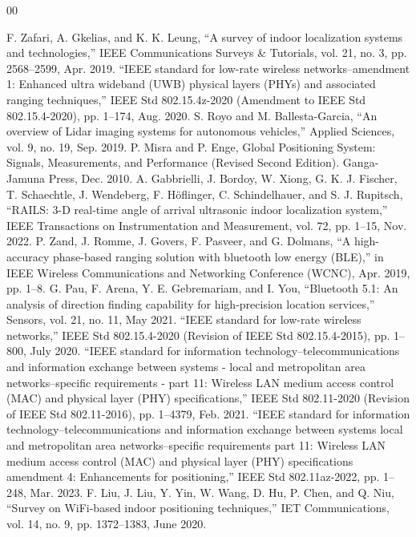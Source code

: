 \documentclass[journal]{IEEEtran}
\begin{document}
\begin{thebibliography}{00}

 F. Zafari, A. Gkelias, and K. K. Leung, “A survey of indoor localization systems and technologies,” IEEE Communications Surveys \& Tutorials, vol. 21, no. 3, pp. 2568–2599, Apr. 2019.
 “IEEE standard for low-rate wireless networks–amendment 1: Enhanced ultra wideband (UWB) physical layers (PHYs) and associated ranging techniques,” IEEE Std 802.15.4z-2020 (Amendment to IEEE Std 802.15.4-2020), pp. 1–174, Aug. 2020.
 S. Royo and M. Ballesta-Garcia, “An overview of Lidar imaging systems for autonomous vehicles,” Applied Sciences, vol. 9, no. 19, Sep. 2019.
 P. Misra and P. Enge, Global Positioning System: Signals, Measurements, and Performance (Revised Second Edition). Ganga-Jamuna Press, Dec. 2010.
 A. Gabbrielli, J. Bordoy, W. Xiong, G. K. J. Fischer, T. Schaechtle, J. Wendeberg, F. H\"oflinger, C. Schindelhauer, and S. J. Rupitsch, “RAILS: 3-D real-time angle of arrival ultrasonic indoor localization system,” IEEE Transactions on Instrumentation and Measurement, vol. 72, pp. 1–15, Nov. 2022.
 P. Zand, J. Romme, J. Govers, F. Pasveer, and G. Dolmans, “A high-accuracy phase-based ranging solution with bluetooth low energy (BLE),” in IEEE Wireless Communications and Networking Conference (WCNC), Apr. 2019, pp. 1–8.
 G. Pau, F. Arena, Y. E. Gebremariam, and I. You, “Bluetooth 5.1: An analysis of direction finding capability for high-precision location services,” Sensors, vol. 21, no. 11, May 2021.
 “IEEE standard for low-rate wireless networks,” IEEE Std 802.15.4-2020 (Revision of IEEE Std 802.15.4-2015), pp. 1–800, July 2020.
 “IEEE standard for information technology–telecommunications and information exchange between systems - local and metropolitan area networks–specific requirements - part 11: Wireless LAN medium access control (MAC) and physical layer (PHY) specifications,” IEEE Std 802.11-2020 (Revision of IEEE Std 802.11-2016), pp. 1–4379, Feb. 2021.
 “IEEE standard for information technology–telecommunications and information exchange between systems local and metropolitan area networks–specific requirements part 11: Wireless LAN medium access control (MAC) and physical layer (PHY) specifications amendment 4: Enhancements for positioning,” IEEE Std 802.11az-2022, pp. 1–248, Mar. 2023.
 F. Liu, J. Liu, Y. Yin, W. Wang, D. Hu, P. Chen, and Q. Niu, “Survey on WiFi-based indoor positioning techniques,” IET Communications, vol. 14, no. 9, pp. 1372–1383, June 2020.

\end{thebibliography}
\end{document}
